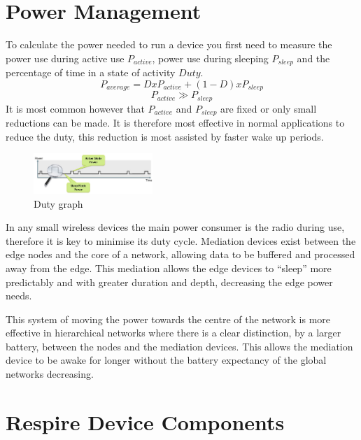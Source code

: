 \section{Power Management}
To calculate the power needed to run a device you first need to measure the power use during
active use \(P_{active}\), power use during sleeping \(P_{sleep}\) and the percentage of time in a state of
activity \(Duty\).
\[
  P_{average} = D x P_{active} + (1-D) x P_{sleep}
\]
\[
  P_{active} \gg P_{sleep}
\]
It is most common however that \(P_{active}\) and \(P_{sleep}\) are fixed or only small reductions can be
made. It is therefore most effective in normal applications to reduce the duty, this reduction is most
assisted by faster wake up periods.


\begin{figure}
  \vspace{-10pt}
  \begin{center}
    \includegraphics[width=0.4\textwidth, keepaspectratio=true]{images/lowenergysystemsoverview_croped.jpg}
  \end{center}
  \caption[Duty Graph]{Duty graph}
  \vspace{-10pt}
\end{figure}

In any small wireless devices the main power consumer is the radio during use, therefore it is key to
minimise its duty cycle. Mediation devices exist between the edge nodes and the core of a network,
allowing data to be buffered and processed away from the edge. This mediation allows the edge
devices to ``sleep'' more predictably and with greater duration and depth, decreasing the edge
power needs.


This system of moving the power towards the centre of the network is more effective in hierarchical networks
where there is a clear distinction, \eg by a larger battery, between the nodes
and the mediation devices. This allows the mediation device to be awake for
longer without the battery expectancy of the global networks decreasing.

\section{Respire Device Components}

